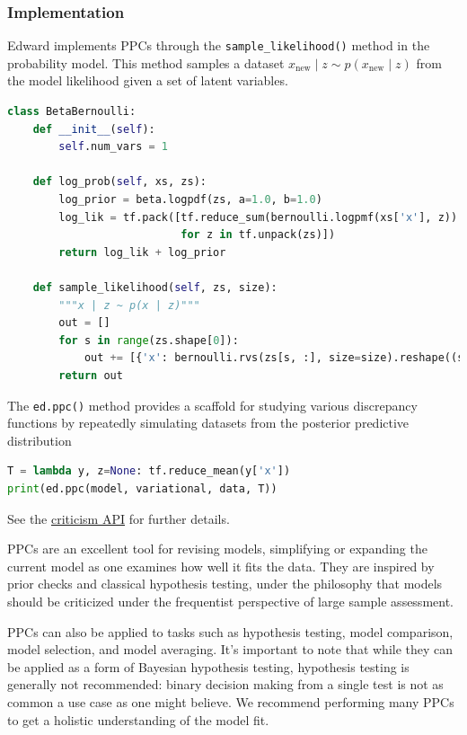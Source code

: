 \subsubsection{Implementation}

Edward implements PPCs through the \texttt{sample_likelihood()}
method in the probability model. This method samples a dataset
$x_{\text{new}}\mid z\sim p(x_{\text{new}}\mid z)$ from the
model likelihood given a set of latent variables.
\begin{lstlisting}[language=Python]
class BetaBernoulli:
    def __init__(self):
        self.num_vars = 1

    def log_prob(self, xs, zs):
        log_prior = beta.logpdf(zs, a=1.0, b=1.0)
        log_lik = tf.pack([tf.reduce_sum(bernoulli.logpmf(xs['x'], z))
                           for z in tf.unpack(zs)])
        return log_lik + log_prior

    def sample_likelihood(self, zs, size):
        """x | z ~ p(x | z)"""
        out = []
        for s in range(zs.shape[0]):
            out += [{'x': bernoulli.rvs(zs[s, :], size=size).reshape((size,))}]
        return out
\end{lstlisting}

The \texttt{ed.ppc()} method provides a scaffold for studying
various discrepancy functions by repeatedly simulating datasets from the
posterior predictive distribution
\begin{lstlisting}[language=Python]
T = lambda y, z=None: tf.reduce_mean(y['x'])
print(ed.ppc(model, variational, data, T))
\end{lstlisting}

See the \href{api/criticisms.html}{criticism API} for further details.

PPCs are an excellent tool for revising models, simplifying or
expanding the current model as one examines how well it fits the data.
They are inspired by prior checks and classical hypothesis
testing, under the philosophy that models should be
criticized under the frequentist perspective of large sample
assessment.

PPCs can also be applied to tasks such as hypothesis testing, model
comparison, model selection, and model averaging.  It's important to
note that while they can be applied as a form of Bayesian hypothesis
testing, hypothesis testing is generally not recommended: binary
decision making from a single test is not as common a use case as one
might believe. We recommend performing many PPCs to get a holistic
understanding of the model fit.

